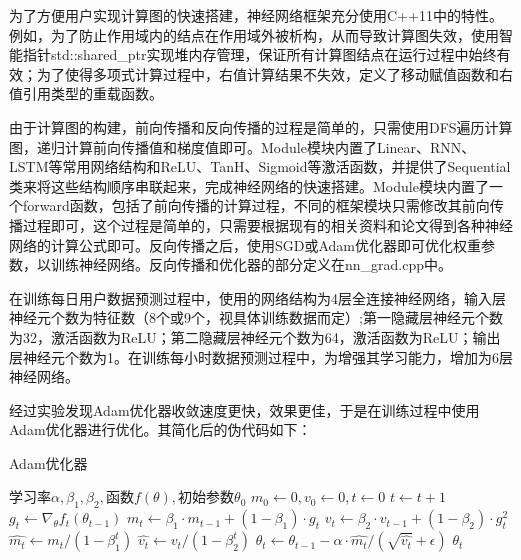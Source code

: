 \documentclass[CJK]{ctexart}
\begin{document}
\begin{enumerate}[(1)]
    \qquad 为了方便用户实现计算图的快速搭建，神经网络框架充分使用C++11中的特性。例如，为了防止作用域内的结点在作用域外被析构，从而导致计算图失效，使用智能指针std::shared\_ptr实现堆内存管理，保证所有计算图结点在运行过程中始终有效；为了使得多项式计算过程中，右值计算结果不失效，定义了移动赋值函数和右值引用类型的重载函数。\par
    \qquad 由于计算图的构建，前向传播和反向传播的过程是简单的，只需使用DFS遍历计算图，递归计算前向传播值和梯度值即可。Module模块内置了Linear、RNN、LSTM等常用网络结构和ReLU、TanH、Sigmoid等激活函数，并提供了Sequential类来将这些结构顺序串联起来，完成神经网络的快速搭建。Module模块内置了一个forward函数，包括了前向传播的计算过程，不同的框架模块只需修改其前向传播过程即可，这个过程是简单的，只需要根据现有的相关资料和论文得到各种神经网络的计算公式即可。反向传播之后，使用SGD或Adam优化器即可优化权重参数，以训练神经网络。反向传播和优化器的部分定义在nn\_grad.cpp中。\par
    \qquad 在训练每日用户数据预测过程中，使用的网络结构为4层全连接神经网络，输入层神经元个数为特征数（8个或9个，视具体训练数据而定）;第一隐藏层神经元个数为32，激活函数为ReLU；第二隐藏层神经元个数为64，激活函数为ReLU；输出层神经元个数为1。在训练每小时数据预测过程中，为增强其学习能力，增加为6层神经网络。\par
    \qquad 经过实验发现Adam优化器收敛速度更快，效果更佳，于是在训练过程中使用Adam优化器进行优化。其简化后的伪代码如下：
    \begin{algorithm}
        \caption{Adam优化器}
        \begin{spacing}{1.1}
        \begin{algorithmic}[1]
            \Require $\textbf{学习率}\alpha,\beta_1,\beta_2,\textbf{函数}f(\theta),\textbf{初始参数}\theta_0$
            \State $m_0\leftarrow0,v_0\leftarrow0,t\leftarrow0$
            \State $t\leftarrow t+1$
            \State $g_t\leftarrow \nabla_\theta f_t(\theta_{t-1})$
            \State $m_t\leftarrow \beta_1\cdot m_{t-1}+(1-\beta_1)\cdot g_t$
            \State $v_t\leftarrow \beta_2\cdot v_{t-1}+(1-\beta_2)\cdot g_t^2$
            \State $\hat{m_t}\leftarrow m_t/(1-\beta_1^t)$
            \State $\hat{v_t}\leftarrow v_t/(1-\beta_2^t)$
            \State $\theta_t\leftarrow \theta_{t-1}-\alpha\cdot\hat{m_t}/(\sqrt{\hat{v_t}}+\epsilon)$
            \EndWhile
            \State \Return $\theta_t$
        \end{algorithmic}    
        \end{spacing}
    \end{algorithm}
\end{enumerate}\par
\end{document}

